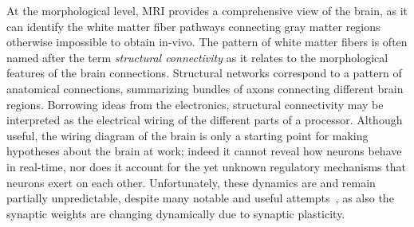 At the morphological level, MRI provides a comprehensive view of the brain, as it can identify the white matter fiber pathways connecting gray matter regions otherwise impossible to obtain in-vivo.
The pattern of white matter fibers is often named after the term \emph{structural connectivity} as it relates to the morphological features of the brain connections.
Structural networks correspond to a pattern of anatomical connections, summarizing bundles of axons connecting different brain regions.
Borrowing ideas from the electronics, structural connectivity may be interpreted as the electrical wiring of the different parts of a processor.
Although useful, the wiring diagram of the brain is only a starting point for making hypotheses about the brain at work; indeed it cannot reveal how neurons behave in real-time, nor does it account for the yet unknown regulatory mechanisms that neurons exert on each other.
Unfortunately, these dynamics are and remain partially unpredictable, despite many notable and useful attempts~\cite{deco2008}, as also the synaptic weights are changing dynamically due to synaptic plasticity.

